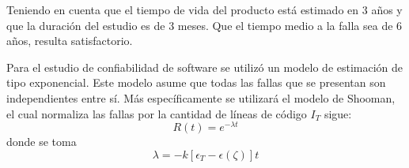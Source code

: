 Teniendo en cuenta que el tiempo de vida del producto está estimado en 3 años y que la duración del estudio es de 3 meses. Que el tiempo medio a la falla sea de 6 años, resulta satisfactorio.

Para el estudio de confiabilidad de software se utilizó un modelo de estimación de tipo exponencial. Este modelo asume que todas las fallas que se presentan son independientes entre sí. Más específicamente se utilizará el modelo de Shooman, el cual normaliza las fallas por la cantidad de líneas de código $I_T$ sigue:
\begin{equation}
	R(t) = e^{-\lambda t}
\end{equation}
donde se toma
\begin{equation}
	\lambda = -k \left[ \epsilon_T - \epsilon(\zeta) \right]t
\end{equation}

